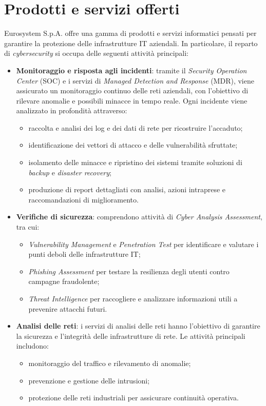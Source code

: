\section{Prodotti e servizi offerti}
Eurosystem S.p.A. offre una gamma di prodotti e servizi informatici pensati per garantire la protezione delle infrastrutture IT aziendali. In particolare, il reparto di \textit{cybersecurity} si occupa delle seguenti attività principali:

\begin{itemize}
    \item \textbf{Monitoraggio e risposta agli incidenti}: tramite il \textit{Security Operation Center} (SOC) e i servizi di \textit{Managed Detection and Response} (MDR), viene assicurato un monitoraggio continuo delle reti aziendali, con l'obiettivo di rilevare anomalie e possibili minacce in tempo reale. Ogni incidente viene analizzato in profondità attraverso:
    \begin{itemize}
        \item raccolta e analisi dei log e dei dati di rete per ricostruire l'accaduto;
        \item identificazione dei vettori di attacco e delle vulnerabilità sfruttate;
        \item isolamento delle minacce e ripristino dei sistemi tramite soluzioni di \textit{backup} e \textit{disaster recovery};
        \item produzione di report dettagliati con analisi, azioni intraprese e raccomandazioni di miglioramento.
    \end{itemize}

    \item \textbf{Verifiche di sicurezza}: comprendono attività di \textit{Cyber Analysis Assessment}, tra cui:
    \begin{itemize}
        \item \textit{Vulnerability Management} e \textit{Penetration Test} per identificare e valutare i punti deboli delle infrastrutture IT;
        \item \textit{Phishing Assessment} per testare la resilienza degli utenti contro campagne fraudolente;
        \item \textit{Threat Intelligence} per raccogliere e analizzare informazioni utili a prevenire attacchi futuri.
    \end{itemize}

    \item \textbf{Analisi delle reti}: i servizi di analisi delle reti hanno l'obiettivo di garantire la sicurezza e l'integrità delle infrastrutture di rete. Le attività principali includono:
    \begin{itemize}
        \item monitoraggio del traffico e rilevamento di anomalie;
        \item prevenzione e gestione delle intrusioni;
        \item protezione delle reti industriali per assicurare continuità operativa.
    \end{itemize}


\end{itemize}
